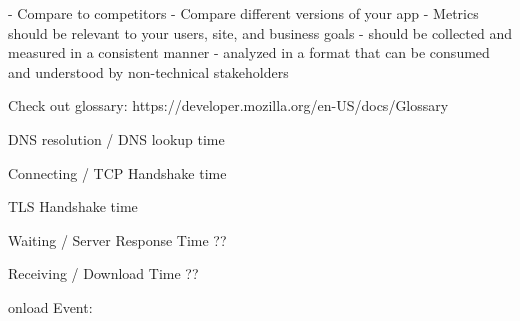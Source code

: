 













- Compare to competitors
- Compare different versions of your app
- Metrics should be relevant to your users, site, and business goals
- should be collected and measured in a consistent manner
- analyzed in a format that can be consumed and understood by non-technical stakeholders





Check out glossary: https://developer.mozilla.org/en-US/docs/Glossary



DNS resolution / DNS lookup time %


Connecting / TCP Handshake time %


TLS Handshake time %


Waiting / Server Response Time ?? %


Receiving / Download Time ?? %




onload Event: %


